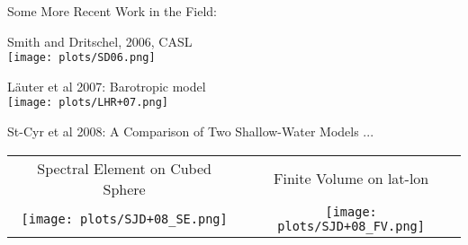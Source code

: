 \begin{slide}{Some More Recent Work in the Field:}

\vspace{20pt}
\begin{minipage}{0.49\linewidth}\begin{list0}
\item
Smith and Dritschel, 2006, CASL\\
\texttt{[image: plots/SD06.png]}
\end{list0}\end{minipage}
%
\begin{minipage}{0.49\linewidth}\begin{list0}
\item
L\"{a}uter et al 2007: Barotropic model\\
\texttt{[image: plots/LHR+07.png]}
\end{list0}\end{minipage}

\begin{list0}\item
St-Cyr et al 2008: A Comparison of Two Shallow-Water Models ...\\
\vspace{-5pt}
\end{list0}\begin{tabular}{cc}
Spectral Element on Cubed Sphere &
Finite Volume on lat-lon \\
\texttt{[image: plots/SJD+08\_SE.png]}&
\texttt{[image: plots/SJD+08\_FV.png]}
\end{tabular}
%
%

\end{slide}
